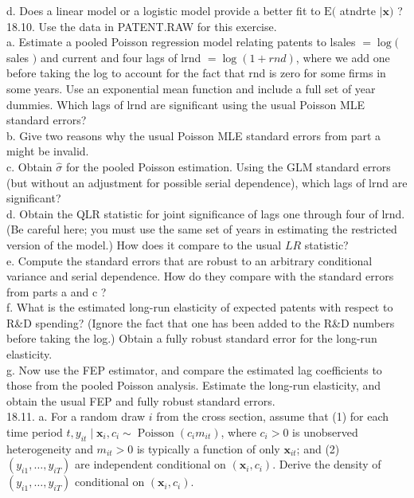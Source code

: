 \documentclass[10pt]{article}
\begin{document}
d. Does a linear model or a logistic model provide a better fit to $\mathrm{E}($ atndrte $\mid \mathbf{x})$ ?\\
18.10. Use the data in PATENT.RAW for this exercise.\\
a. Estimate a pooled Poisson regression model relating patents to lsales $=\log ($ sales $)$ and current and four lags of lrnd $=\log (1+r n d)$, where we add one before taking the log to account for the fact that rnd is zero for some firms in some years. Use an exponential mean function and include a full set of year dummies. Which lags of lrnd are significant using the usual Poisson MLE standard errors?\\
b. Give two reasons why the usual Poisson MLE standard errors from part a might be invalid.\\
c. Obtain $\hat{\sigma}$ for the pooled Poisson estimation. Using the GLM standard errors (but without an adjustment for possible serial dependence), which lags of lrnd are significant?\\
d. Obtain the QLR statistic for joint significance of lags one through four of lrnd. (Be careful here; you must use the same set of years in estimating the restricted version of the model.) How does it compare to the usual $L R$ statistic?\\
e. Compute the standard errors that are robust to an arbitrary conditional variance and serial dependence. How do they compare with the standard errors from parts a and c ?\\
f. What is the estimated long-run elasticity of expected patents with respect to R\&D spending? (Ignore the fact that one has been added to the R\&D numbers before taking the log.) Obtain a fully robust standard error for the long-run elasticity.\\
g. Now use the FEP estimator, and compare the estimated lag coefficients to those from the pooled Poisson analysis. Estimate the long-run elasticity, and obtain the usual FEP and fully robust standard errors.\\
18.11. a. For a random draw $i$ from the cross section, assume that (1) for each time period $t, y_{i t} \mid \mathbf{x}_{i}, c_{i} \sim \operatorname{Poisson}\left(c_{i} m_{i t}\right)$, where $c_{i}>0$ is unobserved heterogeneity and $m_{i t}>0$ is typically a function of only $\mathbf{x}_{i t}$; and (2) $\left(y_{i 1}, \ldots, y_{i T}\right)$ are independent conditional on $\left(\mathbf{x}_{i}, c_{i}\right)$. Derive the density of $\left(y_{i 1}, \ldots, y_{i T}\right)$ conditional on $\left(\mathbf{x}_{i}, c_{i}\right)$.\\
\end{document}
